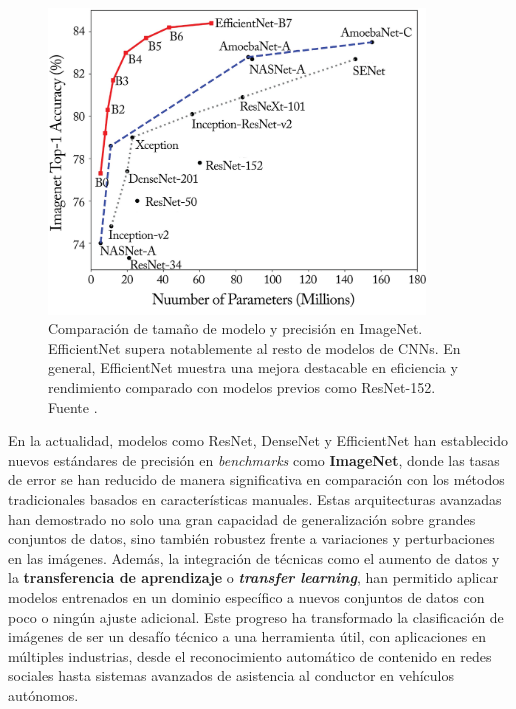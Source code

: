 \begin{figure}[hbt!]
	\centering
	\includegraphics[width=100mm]{img/cnn-sota.png}
	\caption{Comparación de tamaño de modelo y precisión en ImageNet. EfficientNet
		supera notablemente al resto de modelos de CNNs. En general, EfficientNet muestra
		una mejora destacable en eficiencia y rendimiento comparado con modelos previos
		como ResNet-152. Fuente \cite{tan2019efficientnet}.}
\end{figure}

En la actualidad, modelos como ResNet, DenseNet y EfficientNet han establecido
nuevos estándares de precisión en \textit{benchmarks} como \textbf{ImageNet}, donde
las tasas de error se han reducido de manera significativa en comparación con los
métodos tradicionales basados en características manuales. Estas arquitecturas
avanzadas han demostrado no solo una gran capacidad de generalización sobre
grandes conjuntos de datos, sino también robustez frente a variaciones y perturbaciones
en las imágenes. Además, la integración de técnicas como el aumento de datos y la
\textbf{transferencia de aprendizaje} o \textbf{\textit{transfer learning}}, han
permitido aplicar modelos entrenados en un dominio específico a nuevos conjuntos
de datos con poco o ningún ajuste adicional. Este progreso ha transformado la clasificación
de imágenes de ser un desafío técnico a una herramienta útil, con aplicaciones
en múltiples industrias, desde el reconocimiento automático de contenido en redes
sociales hasta sistemas avanzados de asistencia al conductor en vehículos autónomos.

\endinput
